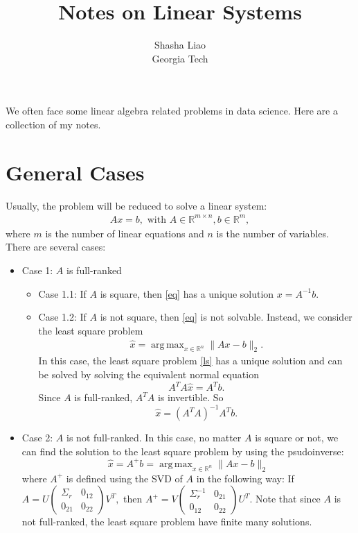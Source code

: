 \documentclass[twoside,12pt]{article}
\DeclareMathOperator*{\argmax}{arg\,max}
\begin{document}
\title{Notes on Linear Systems}
\author {Shasha Liao \\ Georgia Tech}
\maketitle
We often face some linear algebra related problems in data science. Here are a collection of my notes. 
\section{General Cases}
Usually, the problem will be reduced to solve a linear system: 
\begin{align}\label{eq}
Ax = b, \text{ with } A \in \mathbb{R}^{m \times n}, b \in \mathbb{R}^m,
\end{align}
where $m$ is the number of linear equations and $n$ is the number of variables.
There are several cases:
\begin{itemize}
\item Case 1: $A$ is full-ranked
\begin{itemize}
\item Case 1.1: If $A$ is square, then \eqref{eq} has a unique solution $x = A^{-1}b$.
\item Case 1.2: If $A$ is not square, then \eqref{eq} is not solvable. Instead, we consider the least square problem 
\begin{align}\label{ls}
\hat{x} = \argmax_{x \in \mathbb{R}^n} \|Ax - b\|_2.
\end{align}
In this case, the least square problem \eqref{ls} has a unique solution and can be solved by solving the equivalent normal equation $$A^T A \hat{x} = A^T b.$$ Since $A$ is full-ranked, $A^TA$ is invertible. So $$\hat{x} = (A^TA)^{-1}A^Tb.$$
\end{itemize}
\item Case 2: $A$ is not full-ranked.
In this case, no matter $A$ is square or not, we can find the solution to the least square problem by using the psudoinverse: $$\hat{x} = A^{+} b = \argmax_{x \in \mathbb{R}^n} \|Ax - b\|_2 $$ where $A^{+}$ is defined using the SVD of $A$ in the following way:
If $A = U \begin{pmatrix}  \Sigma_r & 0_{12} \\ 0_{21} & 0_{22} \end{pmatrix}  V^T,$ then $A^{+} = V \begin{pmatrix}  \Sigma_r^{-1} & 0_{21} \\ 0_{12} & 0_{22} \end{pmatrix}U^T$. Note that since $A$ is not full-ranked, the least square problem have finite many solutions. 
\end{itemize}
\end{document}

